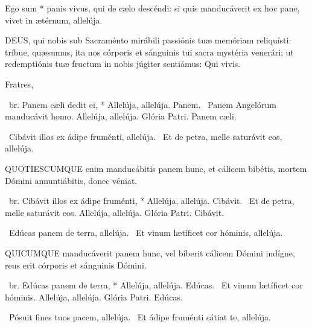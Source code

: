  Ego sum * panis vivus, qui de cælo descéndi: si quis manducáverit ex hoc pane, vivet in ætérnum, allelúja.


\lettrine[lines=2]{D}{EUS}, qui nobis sub Sacraménto mirábili passiónis tuæ memóriam reliquísti: tríbue, quæsumus, ita nos córporis et sánguinis tui sacra mystéria venerári; ut redemptiónis tuæ fructum in nobis júgiter sentiámus: Qui vivis.



 Fratres, 

\R\ br. Panem cæli dedit ei, * Allelúja, allelúja. Panem. \V\ Panem Angelórum manducávit homo. Allelúja, allelúja. Glória Patri. Panem cæli.

\V\ Cibávit illos ex ádipe fruménti, allelúja. \R\ Et de petra, melle saturávit eos, allelúja.



\lettrine[lines=2]{Q}{UOTIESCUMQUE} enim manducábitis panem hunc, et cálicem bibétis, mortem Dómini annuntiábitis, donec véniat.

\R\ br. Cibávit illos ex ádipe fruménti, * Allelúja, allelúja. Cibávit. \V\ Et de petra, melle saturávit eos. Allelúja, allelúja. Glória Patri. Cibávit.

\V\ Edúcas panem de terra, allelúja. \R\ Et vinum lætíficet cor hóminis, allelúja.



\lettrine[lines=2]{Q}{UICUMQUE} manducáverit panem hunc, vel bíberit cálicem Dómini indígne, reus erit córporis et sánguinis Dómini.

\R\ br. Edúcas panem de terra, * Allelúja, allelúja. Edúcas. \V\ Et vinum lætíficet cor hóminis. Allelúja, allelúja. Glória Patri. Edúcas.

\V\ Pósuit fines tuos pacem, allelúja. \R\ Et ádipe fruménti sátiat te, allelúja.


